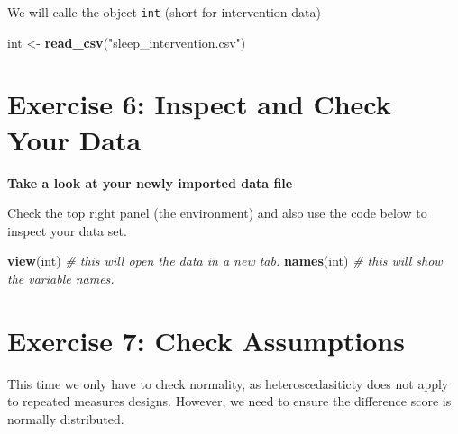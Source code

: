 \documentclass[
]{book}
\newenvironment{Shaded}{\begin{snugshade}}{\end{snugshade}}
\newcommand{\CommentTok}[1]{\textcolor[rgb]{0.56,0.35,0.01}{\textit{#1}}}
\newcommand{\FunctionTok}[1]{\textcolor[rgb]{0.13,0.29,0.53}{\textbf{#1}}}
\newcommand{\NormalTok}[1]{#1}
\newcommand{\OtherTok}[1]{\textcolor[rgb]{0.56,0.35,0.01}{#1}}
\newcommand{\SpecialCharTok}[1]{\textcolor[rgb]{0.81,0.36,0.00}{\textbf{#1}}}
\newcommand{\StringTok}[1]{\textcolor[rgb]{0.31,0.60,0.02}{#1}}
\let\oldsection\section
\renewcommand{\section}{\needspace{5\baselineskip}\oldsection}
\begin{document}
We will calle the object \texttt{int} (short for intervention data)

\begin{Shaded}
\begin{Highlighting}[]
\NormalTok{int }\OtherTok{\textless{}{-}} \FunctionTok{read\_csv}\NormalTok{(}\StringTok{"sleep\_intervention.csv"}\NormalTok{)}
\end{Highlighting}
\end{Shaded}

\section{Exercise 6: Inspect and Check Your Data}\label{exercise-6-inspect-and-check-your-data}

\textbf{Take a look at your newly imported data file}

Check the top right panel (the environment) and also use the code below to inspect your data set.

\begin{Shaded}
\begin{Highlighting}[]
\FunctionTok{view}\NormalTok{(int) }\CommentTok{\# this will open the data in a new tab.}
\FunctionTok{names}\NormalTok{(int) }\CommentTok{\# this will show the variable names.}
\end{Highlighting}
\end{Shaded}

\section{Exercise 7: Check Assumptions}\label{exercise-7-check-assumptions}

This time we only have to check normality, as heteroscedasiticty does not apply to repeated measures designs. However, we need to ensure the difference score is normally distributed.

\begin{Shaded}
\end{Shaded}
\end{document}
